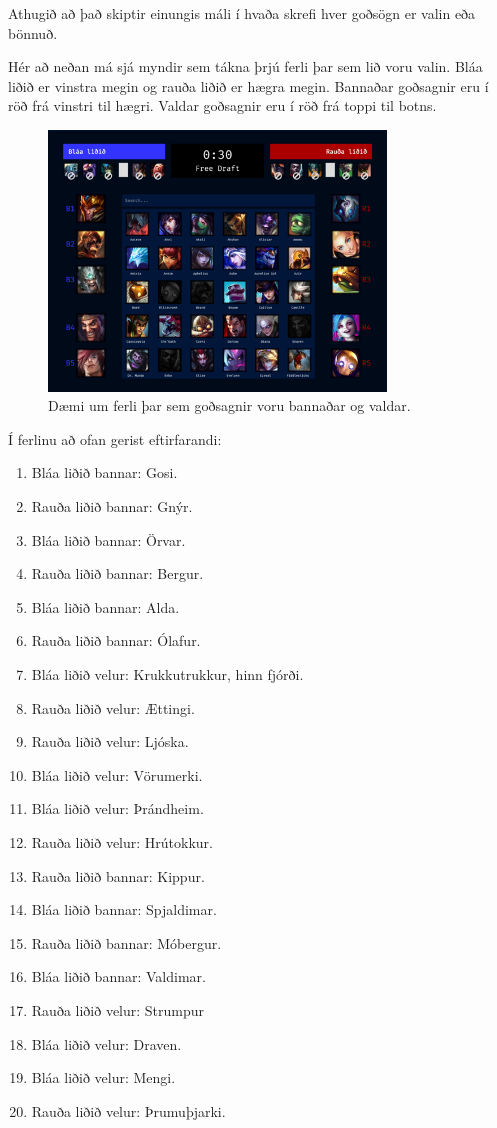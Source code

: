 Athugið að það skiptir einungis máli í hvaða skrefi hver goðsögn er valin eða bönnuð.

Hér að neðan má sjá myndir sem tákna þrjú ferli þar sem lið voru valin.
Bláa liðið er vinstra megin og rauða liðið er hægra megin.
Bannaðar goðsagnir eru í röð frá vinstri til hægri.
Valdar goðsagnir eru í röð frá toppi til botns.

\begin{figure}[h!]
  \centering
    \includegraphics[width=0.8\textwidth]{original_draft.png}
  \caption{Dæmi um ferli þar sem goðsagnir voru bannaðar og valdar.}
\end{figure}

Í ferlinu að ofan gerist eftirfarandi:
\begin{enumerate}
    \item Bláa liðið bannar: Gosi.
    \item Rauða liðið bannar: Gnýr.
    \item Bláa liðið bannar: Örvar.
    \item Rauða liðið bannar: Bergur.
    \item Bláa liðið bannar: Alda.
    \item Rauða liðið bannar: Ólafur.
    \item Bláa liðið velur: Krukkutrukkur, hinn fjórði.
    \item Rauða liðið velur: Ættingi.
    \item Rauða liðið velur: Ljóska.
    \item Bláa liðið velur: Vörumerki.
    \item Bláa liðið velur: Þrándheim.
    \item Rauða liðið velur: Hrútokkur.
    \item Rauða liðið bannar: Kippur.
    \item Bláa liðið bannar: Spjaldimar.
    \item Rauða liðið bannar: Móbergur.
    \item Bláa liðið bannar: Valdimar.
    \item Rauða liðið velur: Strumpur
    \item Bláa liðið velur: Draven.
    \item Bláa liðið velur: Mengi.
    \item Rauða liðið velur: Þrumuþjarki.
\end{enumerate}

